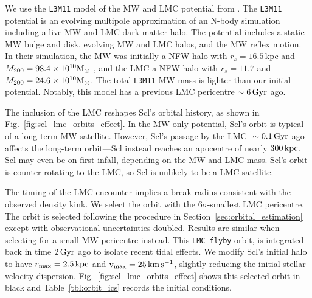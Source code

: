 We use the \texttt{L3M11} model of the MW and LMC potential from
\citet{vasiliev2024}. The \texttt{L3M11} potential is an evolving
multipole approximation of an N-body simulation including a live MW and
LMC dark matter halo. The potential includes a static MW bulge and disk,
evolving MW and LMC halos, and the MW reflex motion. In their
simulation, the MW was initially a NFW halo with \(r_s=16.5\,\)kpc and
\(M_{\rm 200}= 98.4\times10^{10}{\rm M}_{\odot}\) , and the LMC a NFW halo with
\(r_s=11.7\) and \(M_{200} = 24.6 \times 10^{10} {\rm M}_{\odot}\). The total
\texttt{L3M11} MW mass is lighter than our initial \citet{EP2020}
potential. Notably, this model has a previous LMC pericentre
\(\sim6\,{\rm Gyr}\) ago.

The inclusion of the LMC reshapes Scl's orbital history, as shown in
Fig.~\ref{fig:scl_lmc_orbits_effect}. In the MW-only potential, Scl's
orbit is typical of a long-term MW satellite. However, Scl's passage by
the LMC \(~\sim0.1\,{\rm Gyr}\) ago affects the long-term orbit---Scl instead
reaches an apocentre of nearly \(300\,{\rm kpc}\). Scl may even be on first
infall, depending on the MW and LMC mass. Scl's orbit is
counter-rotating to the LMC, so Scl is unlikely to be a LMC satellite.

The timing of the LMC encounter implies a break radius consistent with
the observed density kink. We select the orbit with the
\(6\sigma\)-smallest LMC pericentre. The orbit is selected following the
procedure in Section~\ref{sec:orbital_estimation} except with
observational uncertainties doubled. Results are similar when selecting
for a small MW pericentre instead. This \texttt{LMC-flyby} orbit, is
integrated back in time \(2\,{\rm Gyr}\) ago to isolate recent tidal effects.
We modify Scl's initial halo to have \(r_{\rm max} = 2.5\,{\rm kpc}\) and
\({\rm v}_{\rm max} = 25\,{\rm km\,s^{-1}}\), slightly reducing the initial stellar velocity
dispersion. Fig.~\ref{fig:scl_lmc_orbits_effect} shows this selected
orbit in black and Table~\ref{tbl:orbit_ics} records the initial
conditions.


